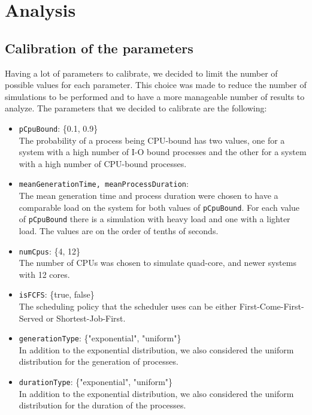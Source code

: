\chapter{Analysis}

\section{Calibration of the parameters}

Having a lot of parameters to calibrate, we decided to limit the number of possible values for each parameter. This choice was made to reduce the number of simulations to be performed and to have a more manageable number of results to analyze. The parameters that we decided to calibrate are the following:

\begin{itemize}
    \item \texttt{pCpuBound}: \{0.1, 0.9\} \\
          The probability of a process being CPU-bound has two values, one for a system with a high number of I-O bound processes and the other for a system with a high number of CPU-bound processes.
    \item \texttt{meanGenerationTime, meanProcessDuration}:\\
          The mean generation time and process duration were chosen to have a comparable load on the system for both values of \texttt{pCpuBound}. For each value of \texttt{pCpuBound} there is a simulation with heavy load and one with a lighter load. The values are on the order of tenths of seconds.
    \item \texttt{numCpus}: \{4, 12\} \\
          The number of CPUs was chosen to simulate quad-core, and newer systems with 12 cores.
    \item \texttt{isFCFS}: \{true, false\} \\
          The scheduling policy that the scheduler uses can be either First-Come-First-Served or Shortest-Job-First.
    \item \texttt{generationType}: \{"exponential", "uniform"\} \\
          In addition to the exponential distribution, we also considered the uniform distribution for the generation of processes.
    \item \texttt{durationType}: \{"exponential", "uniform"\} \\
          In addition to the exponential distribution, we also considered the uniform distribution for the duration of the processes.
\end{itemize}



